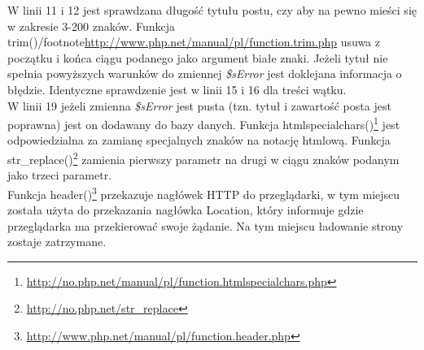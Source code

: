 \documentclass[a4paper,10pt]{article}
\begin{document}
{W linii 11 i 12 jest sprawdzana długość tytułu postu, czy aby na pewno mieści się w zakresie 3-200 znaków. Funkcja trim()/footnote{\href{http://www.php.net/manual/pl/function.trim.php}{http://www.php.net/manual/pl/function.trim.php}} usuwa z początku i końca ciągu podanego jako argument białe znaki. Jeżeli tytuł nie spełnia powyższych warunków do zmiennej \textit{\$sError} jest doklejana informacja o błędzie. Identyczne sprawdzenie jest w linii 15 i 16 dla treści wątku. \\
W linii 19 jeżeli zmienna \textit{\$sError} jest pusta (tzn. tytuł i zawartość posta jest poprawna) jest on dodawany do bazy danych. Funkcja htmlspecialchars()\footnote{\href{http://no.php.net/manual/pl/function.htmlspecialchars.php}{http://no.php.net/manual/pl/function.htmlspecialchars.php}} jest odpowiedzialna za zamianę specjalnych znaków na notację htmlową. Funkcja str\_replace()\footnote{\href{http://no.php.net/str\_replace}{http://no.php.net/str\_replace}} zamienia pierwszy parametr na drugi w ciągu znaków podanym jako trzeci parametr. \\
Funkcja header()\footnote{\href{http://www.php.net/manual/pl/function.header.php}{http://www.php.net/manual/pl/function.header.php}} przekazuje nagłówek HTTP do przeglądarki, w tym miejscu została użyta do przekazania nagłówka Location, który informuje gdzie przeglądarka ma przekierować swoje żądanie. Na tym miejscu ładowanie strony zostaje zatrzymane.
}
\end{document}
